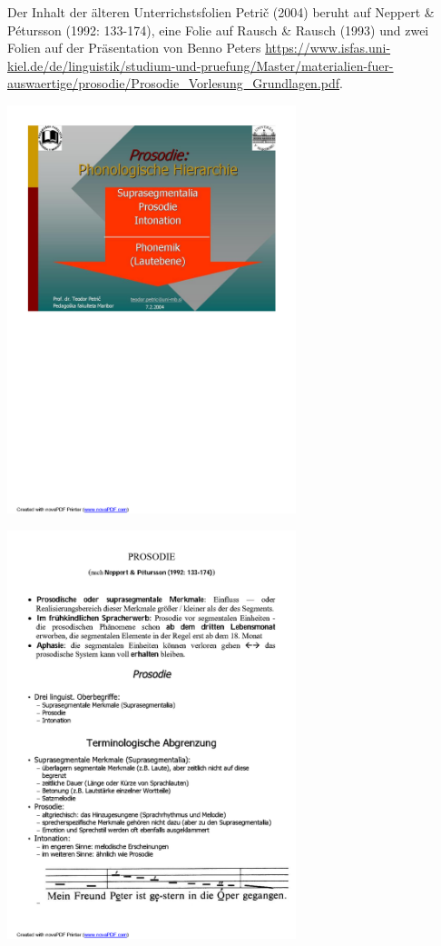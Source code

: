 \documentclass[
  letterpaper,
]{scrbook}
\begin{document}
Der Inhalt der älteren Unterrichstsfolien Petrič (2004) beruht auf
Neppert \& Pétursson (1992: 133-174), eine Folie auf Rausch \& Rausch
(1993) und zwei Folien auf der Präsentation von Benno Peters
\url{https://www.isfas.uni-kiel.de/de/linguistik/studium-und-pruefung/Master/materialien-fuer-auswaertige/prosodie/Prosodie_Vorlesung_Grundlagen.pdf}.

\includegraphics[width=3.31in,height=\textheight]{./pictures/prosodie/06_Prosodie_Folie_2005-06_R_Page1.png}

\includegraphics[width=3.31in,height=\textheight]{./pictures/prosodie/06_Prosodie_Folie_2005-06_R_Page2.png}
\end{document}
